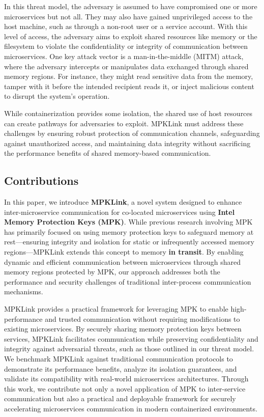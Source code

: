 \documentclass[letterpaper,twocolumn,10pt]{article}
\begin{document}
In this threat model, the adversary is assumed to have compromised one or more microservices but not all.
They may also have gained unprivileged access to the host machine, such as through a non-root user or a service account.
With this level of access, the adversary aims to exploit shared resources like memory or the filesystem to violate the confidentiality or integrity of communication between microservices.
One key attack vector is a man-in-the-middle (MITM) attack, where the adversary intercepts or manipulates data exchanged through shared memory regions.
For instance, they might read sensitive data from the memory, tamper with it before the intended recipient reads it, or inject malicious content to disrupt the system's operation.

While containerization provides some isolation, the shared use of host resources can create pathways for adversaries to exploit.
MPKLink must address these challenges by ensuring robust protection of communication channels, safeguarding against unauthorized access, and maintaining data integrity without sacrificing the performance benefits of shared memory-based communication.

\subsection{Contributions}
In this paper, we introduce \textbf{MPKLink}, a novel system designed to enhance inter-microservice communication for co-located microservices using \textbf{Intel Memory Protection Keys (MPK)}.
While previous research involving MPK has primarily focused on using memory protection keys to safeguard memory at rest—ensuring integrity and isolation for static or infrequently accessed memory regions—MPKLink extends this concept to memory \textbf{in transit}.
By enabling dynamic and efficient communication between microservices through shared memory regions protected by MPK, our approach addresses both the performance and security challenges of traditional inter-process communication mechanisms.


MPKLink provides a practical framework for leveraging MPK to enable high-performance and trusted communication without requiring modifications to existing microservices.
By securely sharing memory protection keys between services, MPKLink facilitates communication while preserving confidentiality and integrity against adversarial threats, such as those outlined in our threat model.
We benchmark MPKLink against traditional communication protocols to demonstrate its performance benefits, analyze its isolation guarantees, and validate its compatibility with real-world microservices architectures.
Through this work, we contribute not only a novel application of MPK to inter-service communication but also a practical and deployable framework for securely accelerating microservices communication in modern containerized environments.
\end{document}
